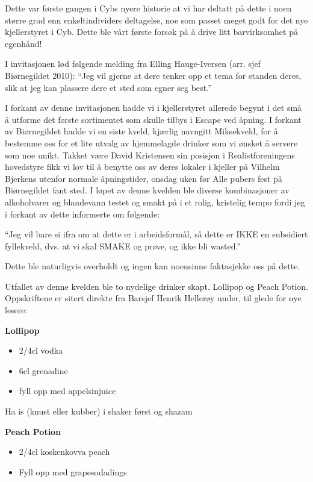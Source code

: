 Dette var første gangen i Cybs nyere historie at vi har deltatt på dette i noen større grad enn enkeltindividers deltagelse, noe som passet meget godt for det nye kjellerstyret i Cyb. Dette ble vårt første forsøk på å drive litt barvirksomhet på egenhånd!

I invitasjonen lød følgende melding fra Elling Hauge-Iversen (arr. sjef Biørnegildet 2010): ``Jeg vil gjerne at dere tenker opp et tema for standen deres, slik at jeg kan plassere dere et sted som egner seg best.''

I forkant av denne invitasjonen hadde vi i kjellerstyret allerede begynt i det små å utforme det første sortimentet som skulle tilbys i Escape ved åpning. I forkant av Biørnegildet hadde vi en siste kveld, kjærlig navngitt Miksekveld, for å bestemme oss for et lite utvalg av hjemmelagde drinker som vi ønsket å servere som noe unikt. Takket være David Kristensen sin posisjon i Realistforeningens hovedstyre fikk vi lov til å benytte oss av deres lokaler i kjeller på Vilhelm Bjerkens utenfor normale åpningstider, onsdag uken før Alle pubers fest på Biørnegildet fant sted. I løpet av denne kvelden ble diverse kombinasjoner av alkoholvarer og blandevann testet og smakt på i et rolig, kristelig tempo fordi jeg i forkant av dette informerte om følgende:

``Jeg vil bare si ifra om at dette er i arbeidsformål, så dette er IKKE en subsidiert fyllekveld, dvs. at vi skal SMAKE og prøve, og ikke bli wasted.''

Dette ble naturligvis overholdt og ingen kan noensinne faktasjekke oss på dette.

Utfallet av denne kvelden ble to nydelige drinker skapt. Lollipop og Peach Potion. Oppskriftene er sitert direkte fra Barsjef Henrik Hellerøy under, til glede for nye lesere:

\textbf{Lollipop}

\begin{itemize}
	\item 2/4cl vodka
	\item 6cl grenadine
	\item fyll opp med appelsinjuice
\end{itemize}

Ha is (knust eller kubber) i shaker først og shazam

\textbf{Peach Potion}

\begin{itemize}
	\item 2/4cl koskenkovva peach
	\item Fyll opp med grapesodadings
\end{itemize}

